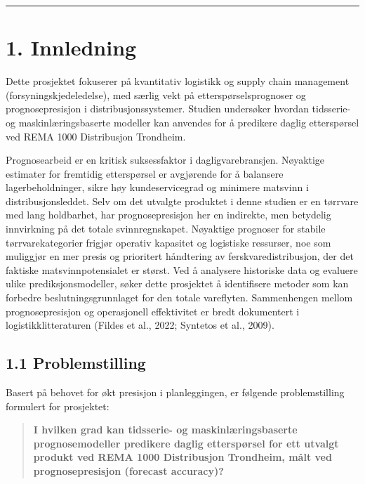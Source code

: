 \documentclass[
  norsk,
  11pt,
  a4paper,
]{article}
\begin{document}
\begin{center}\rule{0.5\linewidth}{0.5pt}\end{center}

\newpage
\tableofcontents
\newpage

\section{1. Innledning}\label{innledning}

Dette prosjektet fokuserer på kvantitativ logistikk og supply chain
management (forsyningskjedeledelse), med særlig vekt på
etterspørselsprognoser og prognosepresisjon i distribusjonssystemer.
Studien undersøker hvordan tidsserie- og maskinlæringsbaserte modeller
kan anvendes for å predikere daglig etterspørsel ved REMA 1000
Distribusjon Trondheim.

Prognosearbeid er en kritisk suksessfaktor i dagligvarebransjen.
Nøyaktige estimater for fremtidig etterspørsel er avgjørende for å
balansere lagerbeholdninger, sikre høy kundeservicegrad og minimere
matsvinn i distribusjonsleddet. Selv om det utvalgte produktet i denne
studien er en tørrvare med lang holdbarhet, har prognosepresisjon her en
indirekte, men betydelig innvirkning på det totale svinnregnskapet.
Nøyaktige prognoser for stabile tørrvarekategorier frigjør operativ
kapasitet og logistiske ressurser, noe som muliggjør en mer presis og
prioritert håndtering av ferskvaredistribusjon, der det faktiske
matsvinnpotensialet er størst. Ved å analysere historiske data og
evaluere ulike prediksjonsmodeller, søker dette prosjektet å
identifisere metoder som kan forbedre beslutningsgrunnlaget for den
totale vareflyten. Sammenhengen mellom prognosepresisjon og operasjonell
effektivitet er bredt dokumentert i logistikklitteraturen (Fildes et
al., 2022; Syntetos et al., 2009).

\subsection{1.1 Problemstilling}\label{problemstilling}

Basert på behovet for økt presisjon i planleggingen, er følgende
problemstilling formulert for prosjektet:

\begin{quote}
\textbf{I hvilken grad kan tidsserie- og maskinlæringsbaserte
prognosemodeller predikere daglig etterspørsel for ett utvalgt produkt
ved REMA 1000 Distribusjon Trondheim, målt ved prognosepresisjon
(forecast accuracy)?}
\end{quote}
\end{document}
